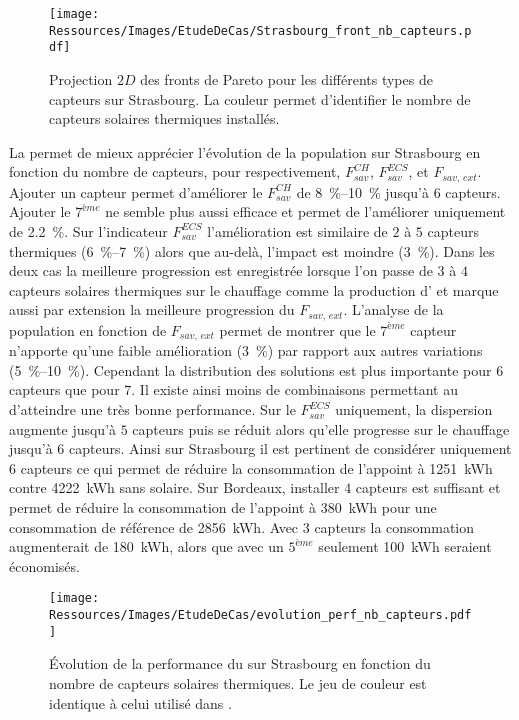 \begin{figure}
    \centering
    \texttt{[image: Ressources/Images/EtudeDeCas/Strasbourg\_front\_nb\_capteurs.pdf]}
    \caption[Fronts de Pareto pour les différents types de capteurs sur Strasbourg]
             {Projection $2D$ des fronts de Pareto pour les différents types de capteurs sur Strasbourg.
             La couleur permet d’identifier le nombre de capteurs solaires thermiques installés.}
    \label{fig:front_pareto_nb_th}
\end{figure}


La  permet de mieux apprécier l’évolution de la
population sur Strasbourg en fonction du nombre de capteurs, pour respectivement, $F_{sav}^{CH}$,
$F_{sav}^{ECS}$, et $F_{sav,\, ext}$. Ajouter un capteur permet d’améliorer le
$F_{sav}^{CH}$ de \SIrange{8}{10}{\percent} jusqu’à $6$ capteurs. Ajouter le $7^{ème}$ ne
semble plus aussi efficace et permet de l’améliorer uniquement de \SI{2.2}{\percent}. Sur
l’indicateur $F_{sav}^{ECS}$ l’amélioration est similaire de $2$ à $5$ capteurs thermiques
(\SIrange{6}{7}{\percent}) alors que au-delà, l’impact est moindre (\SI{3}{\percent}).
Dans les deux cas la meilleure progression est enregistrée lorsque l’on passe de $3$ à $4$
capteurs solaires thermiques sur le chauffage comme la production d’ et marque
aussi par extension la meilleure progression du $F_{sav,\, ext}$. L’analyse de la
population en fonction de $F_{sav,\, ext}$ permet de montrer que le $7^{ème}$ capteur
n’apporte qu’une faible amélioration (\SI{3}{\percent}) par rapport aux autres variations
(\SIrange{5}{10}{\percent}). Cependant la distribution des solutions est plus importante
pour $6$ capteurs que pour $7$. Il existe ainsi moins de combinaisons permettant au
 d’atteindre une très bonne performance. Sur le $F_{sav}^{ECS}$ uniquement, la
dispersion augmente jusqu’à $5$ capteurs puis se réduit alors qu’elle progresse sur le
chauffage jusqu’à $6$ capteurs. Ainsi sur Strasbourg il est pertinent de considérer
uniquement $6$ capteurs ce qui permet de réduire la consommation de l’appoint à
\SI{1251}{kWh} contre \SI{4222}{kWh} sans solaire. Sur Bordeaux, installer $4$ capteurs
est suffisant et permet de réduire la consommation de l’appoint à \SI{380}{kWh} pour une
consommation de référence de \SI{2856}{kWh}. Avec $3$ capteurs la consommation
augmenterait de \SI{180}{kWh}, alors que avec un $5^{ème}$ seulement \SI{100}{kWh} seraient
économisés.

\begin{figure}
    \centering
    \texttt{[image: Ressources/Images/EtudeDeCas/evolution\_perf\_nb\_capteurs.pdf]}
    \caption[Performance du  sur Strasbourg en fonction du nombre de capteurs solaires thermiques]
             {Évolution de la performance du  sur Strasbourg en fonction du nombre de capteurs solaires thermiques.
              Le jeu de couleur est identique à celui utilisé dans .}
    \label{fig:perf_nb_th}
\end{figure}


